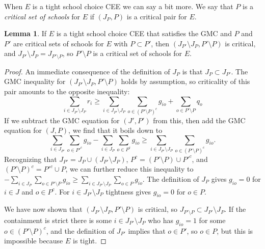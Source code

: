\documentclass[12pt]{article}
\theoremstyle{definition}
\newtheorem{lem}{Lemma}
\begin{document}
When $E$ is a tight school choice CEE we can say a bit more.  We say that $P$ is a \emph{critical set of schools} for $E$ if $(J_P,P)$ is a critical pair for $E$.  

\begin{lem}
If $E$ is a tight school choice CEE that satisfies the GMC and $P$ and $P'$ are critical sets of schools for $E$ with  $P \subset P'$, then $(J_{P'} \setminus J_P, P' \setminus P)$ is critical, and $J_{P'} \setminus J_P = J_{P' \setminus P}$, so $P' \setminus P$ is a critical set of schools for $E$.
\end{lem}

\begin{proof}
  An immediate consequence of the definition of $J_P$ is that $J_P \subset J_{P'}$.  The GMC inequality for $(J_{P'} \setminus J_P,P' \setminus P)$ holds by assumption, so criticality of this pair amounts to the opposite inequality:
$$\sum_{i \in J_{P'} \setminus J_P} r_i \ge \sum_{i \in J_{P'} \setminus J_P} \sum_{o
  \in (P' \setminus P)^c} g_{io} + \sum_{o
  \in P' \setminus P} q_o$$
If we subtract the GMC equation for $(J',P')$ from this, then add the GMC equation for $(J,P)$, we find that it boils down to $$\sum_{i \in J_{P'}} \sum_{o
  \in {P'}^c} g_{io} - \sum_{i \in J_P} \sum_{o
  \in P^c} g_{io} \ge \sum_{i \in J_{P'} \setminus J_P} \sum_{o
  \in (P' \setminus P)^c} g_{io}.$$  
  Recognizing that $J_{P'} = J_P \cup (J_{P'} \setminus J_P)$, $P^c =( P' \setminus P) \cup {P'}^c$, and $(P' \setminus P)^c = {P'}^c \cup P$, we can further reduce this inequality to $-\sum_{i \in J_P} \sum_{o \in P' \setminus P} g_{io} \ge \sum_{i \in J_{P'} \setminus J_P} \sum_{o \in P} g_{io}$.  The definition of $J_P$ gives $g_{io} = 0$ for $i \in J$ and $o \in P^c$.
  For $i \in J_{P'} \setminus J_P$ tightness gives $g_{io} = 0$ for $o \in P$.
  
  We have now shown that $(J_{P'} \setminus J_P, P' \setminus P)$ is critical, so $J_{P' \setminus P} \subset J_{P'} \setminus J_P$.  If the containment is strict there is some $i \in J_{P'} \setminus J_P$ who has $g_{io} = 1$ for some $o \in (P' \setminus P)^c$, and the definition of $J_{P'}$ implies that $o \in P'$, so $o \in P$, but this is impossible because $E$ is tight.
\end{proof}

\end{document}
